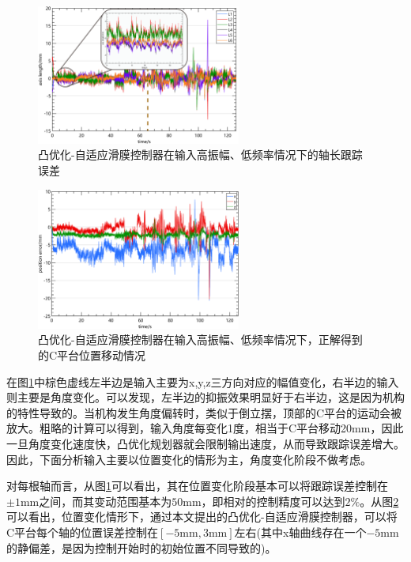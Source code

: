 \begin{figure}[H]
    \centering
    \includegraphics[width=0.6\textwidth]{imgs/Experiment/C-AH-FL_1_axis_diff_length.png}
    \caption{凸优化-自适应滑膜控制器在输入高振幅、低频率情况下的轴长跟踪误差}
    \label{fig:C-AH-FL_1_axis_diff_length}
\end{figure}

\begin{figure}[H]
    \centering
    \includegraphics[width=0.6\textwidth]{imgs/Experiment/C-AH-FL_1_c_movement.png}
    \caption{凸优化-自适应滑膜控制器在输入高振幅、低频率情况下，正解得到的C平台位置移动情况}
    \label{fig:C-AH-FL_1_c_movement}
\end{figure}

在图\ref{fig:C-AH-FL_1_axis_diff_length}中棕色虚线左半边是输入主要为x,y,z三方向对应的幅值变化，右半边的输入则主要是角度变化。可以发现，左半边的抑振效果明显好于右半边，这是因为机构的特性导致的。当机构发生角度偏转时，类似于倒立摆，顶部的C平台的运动会被放大。粗略的计算可以得到，输入角度每变化1度，相当于C平台移动20mm，因此一旦角度变化速度快，凸优化规划器就会限制输出速度，从而导致跟踪误差增大。因此，下面分析输入主要以位置变化的情形为主，角度变化阶段不做考虑。

对每根轴而言，从图\ref{fig:C-AH-FL_1_axis_diff_length}可以看出，其在位置变化阶段基本可以将跟踪误差控制在$\pm 1 \mathrm{mm}$之间，而其变动范围基本为$50 \mathrm{mm}$，即相对的控制精度可以达到$2\%$。从图\ref{fig:C-AH-FL_1_c_movement}可以看出，位置变化情形下，通过本文提出的凸优化-自适应滑膜控制器，可以将C平台每个轴的位置误差控制在$\left[ -5\mathrm{mm},3\mathrm{mm} \right] $左右(其中x轴曲线存在一个$-5\mathrm{mm}$的静偏差，是因为控制开始时的初始位置不同导致的)。

